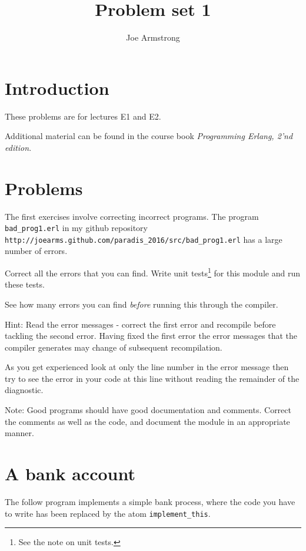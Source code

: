\documentclass[12pt]{hitec}
\title{Problem set 1}
\author{Joe Armstrong}
\begin{document}
\maketitle

\tableofcontents

\section{Introduction}
These problems are for lectures E1 and E2.

Additional material can be found in the course book
{\sl Programming Erlang, 2'nd edition}.

\section{Problems}

The first exercises involve correcting
incorrect programs. The program \verb+bad_prog1.erl+ in my github repository
\newline
\verb+http://joearms.github.com/paradis_2016/src/bad_prog1.erl+ has a
large number of errors.


Correct all the errors that you can find.  Write unit
tests\footnote{See the note on unit tests.}  for this module and run
these tests.

See how many errors you can find {\sl before} running this through the
compiler.

Hint: Read the error messages - correct the first error and recompile
before tackling the second error. Having fixed the first error the
error messages that the compiler generates may change of subsequent
recompilation.

As you get experienced look at only the line number in the error
message then try to see the error in your code at this line without
reading the remainder of the diagnostic.

Note: Good programs should have good documentation and
comments. Correct the comments as well as the code, and document the
module in an appropriate manner.



\section{A bank account}

The follow program implements a simple bank process, where the code
you have to write has been replaced by the atom \verb+implement_this+.
\end{document}
